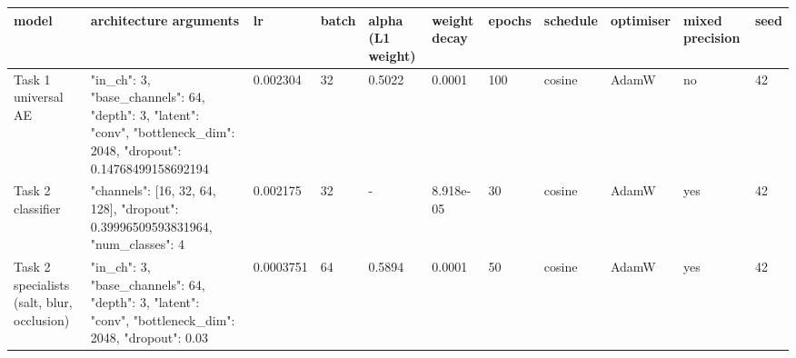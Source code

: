 \begin{tabular}{lllllllllll}
\hline
model & architecture arguments & lr & batch & alpha (L1 weight) & weight decay & epochs & schedule & optimiser & mixed precision & seed \\
\hline
Task 1 universal AE & {"in\_ch": 3, "base\_channels": 64, "depth": 3, "latent": "conv", "bottleneck\_dim": 2048, "dropout": 0.14768499158692194} & 0.002304 & 32 & 0.5022 & 0.0001 & 100 & cosine & AdamW & no & 42 \\
Task 2 classifier & {"channels": [16, 32, 64, 128], "dropout": 0.39996509593831964, "num\_classes": 4} & 0.002175 & 32 & - & 8.918e-05 & 30 & cosine & AdamW & yes & 42 \\
Task 2 specialists (salt, blur, occlusion) & {"in\_ch": 3, "base\_channels": 64, "depth": 3, "latent": "conv", "bottleneck\_dim": 2048, "dropout": 0.03} & 0.0003751 & 64 & 0.5894 & 0.0001 & 50 & cosine & AdamW & yes & 42 \\
\hline
\end{tabular}
